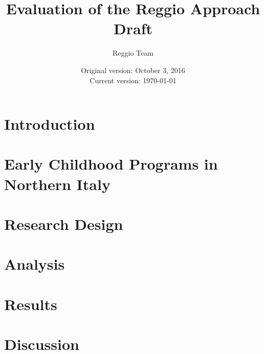 






\title{\Large \textbf{Evaluation of the Reggio Approach} \\ Draft}
\author{\normalsize Reggio Team}
\date{\normalsize Original version: October 3, 2016 \\ Current version: \today}
\maketitle

\tableofcontents

\clearpage
\doublespacing

\section{Introduction}
\label{sec:introduction}


\section{Early Childhood Programs in Northern Italy}
\label{sec:ece-italy}


\section{Research Design}
\label{sec:data}




\section{Analysis}
\label{sec:methodology}
%


\section{Results}
\label{sec:result}

\clearpage

\section{Discussion}
\label{sec:discussion}


\clearpage






